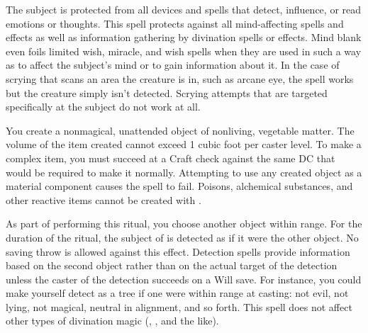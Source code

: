 \spelldur{\durext}
\spelleffect The subject is protected from all devices and spells that detect, influence, or read emotions or thoughts. This spell protects against all mind-affecting spells and effects as well as information gathering by divination spells or effects. Mind blank even foils limited wish, miracle, and wish spells when they are used in such a way as to affect the subject's mind or to gain information about it. In the case of scrying that scans an area the creature is in, such as arcane eye, the spell works but the creature simply isn't detected. Scrying attempts that are targeted specifically at the subject do not work at all.

\spelldur{\durext \dismissable}
\spelleffect You create a nonmagical, unattended object of nonliving, vegetable matter. The volume of the item created cannot exceed 1 cubic foot per caster level. To make a complex item, you must succeed at a Craft check against the same DC that would be required to make it normally.
\spellnotes Attempting to use any created object as a material component causes the spell to fail. Poisons, alchemical substances, and other reactive items cannot be created with .

\spelldur{\durext \dismissable}
\spelleffect As part of performing this ritual, you choose another object within range. For the duration of the ritual, the subject of  is detected as if it were the other object. No saving throw is allowed against this effect. Detection spells provide information based on the second object rather than on the actual target of the detection unless the caster of the detection succeeds on a Will save. For instance, you could make yourself detect as a tree if one were within range at casting: not evil, not lying, not magical, neutral in alignment, and so forth.
\spellnotes This spell does not affect other types of divination magic (, , and the like).


